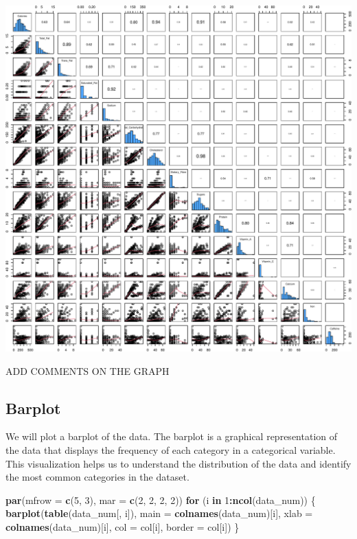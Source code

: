 \documentclass[
]{article}
\newenvironment{Shaded}{\begin{snugshade}}{\end{snugshade}}
\newcommand{\AttributeTok}[1]{\textcolor[rgb]{0.13,0.29,0.53}{#1}}
\newcommand{\ControlFlowTok}[1]{\textcolor[rgb]{0.13,0.29,0.53}{\textbf{#1}}}
\newcommand{\DecValTok}[1]{\textcolor[rgb]{0.00,0.00,0.81}{#1}}
\newcommand{\FunctionTok}[1]{\textcolor[rgb]{0.13,0.29,0.53}{\textbf{#1}}}
\newcommand{\NormalTok}[1]{#1}
\newcommand{\SpecialCharTok}[1]{\textcolor[rgb]{0.81,0.36,0.00}{\textbf{#1}}}
\begin{document}
\begin{center}\includegraphics{Statistical_Learning_Final_Report_files/figure-latex/pairplot-1} \end{center}

ADD COMMENTS ON THE GRAPH

\subsection{Barplot}\label{barplot}

We will plot a barplot of the data. The barplot is a graphical
representation of the data that displays the frequency of each category
in a categorical variable. This visualization helps us to understand the
distribution of the data and identify the most common categories in the
dataset.

\begin{Shaded}
\begin{Highlighting}[]
\FunctionTok{par}\NormalTok{(}\AttributeTok{mfrow =} \FunctionTok{c}\NormalTok{(}\DecValTok{5}\NormalTok{, }\DecValTok{3}\NormalTok{), }\AttributeTok{mar =} \FunctionTok{c}\NormalTok{(}\DecValTok{2}\NormalTok{, }\DecValTok{2}\NormalTok{, }\DecValTok{2}\NormalTok{, }\DecValTok{2}\NormalTok{))}
\ControlFlowTok{for}\NormalTok{ (i }\ControlFlowTok{in} \DecValTok{1}\SpecialCharTok{:}\FunctionTok{ncol}\NormalTok{(data\_num)) \{}
  \FunctionTok{barplot}\NormalTok{(}\FunctionTok{table}\NormalTok{(data\_num[, i]), }\AttributeTok{main =} \FunctionTok{colnames}\NormalTok{(data\_num)[i],}
          \AttributeTok{xlab =} \FunctionTok{colnames}\NormalTok{(data\_num)[i], }\AttributeTok{col =}\NormalTok{ col[i], }\AttributeTok{border =}\NormalTok{ col[i])}
\NormalTok{\}}
\end{Highlighting}
\end{Shaded}
\end{document}
